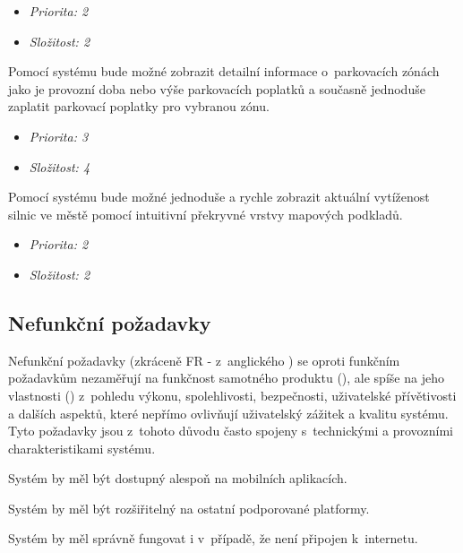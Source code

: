 \begin{itemize}
  \item \textit{Priorita: 2}
  \item \textit{Složitost: 2}
\end{itemize}

Pomocí systému bude možné zobrazit detailní informace o~parkovacích zónách jako je provozní doba nebo výše parkovacích poplatků a současně jednoduše zaplatit parkovací poplatky pro vybranou zónu.
\begin{itemize}
  \item \textit{Priorita: 3}
  \item \textit{Složitost: 4}
\end{itemize}

Pomocí systému bude možné jednoduše a rychle zobrazit aktuální vytíženost silnic ve městě pomocí intuitivní překryvné vrstvy mapových podkladů.

\begin{itemize}
  \item \textit{Priorita: 2}
  \item \textit{Složitost: 2}
\end{itemize}

\subsection{Nefunkční požadavky}
Nefunkční požadavky (zkráceně FR - z~anglického ) se oproti funkčním požadavkům nezaměřují na funkčnost samotného produktu (),
ale spíše na jeho vlastnosti () z~pohledu
výkonu, spolehlivosti, bezpečnosti, uživatelské přívětivosti a dalších aspektů, které nepřímo ovlivňují uživatelský zážitek a kvalitu systému. 
Tyto požadavky jsou z~tohoto důvodu často spojeny s~technickými a provozními charakteristikami systému.

Systém by měl být dostupný alespoň na mobilních aplikacích.



Systém by měl být rozšiřitelný na ostatní podporované platformy. %

Systém by měl správně fungovat i v~případě, že není připojen k~internetu.

